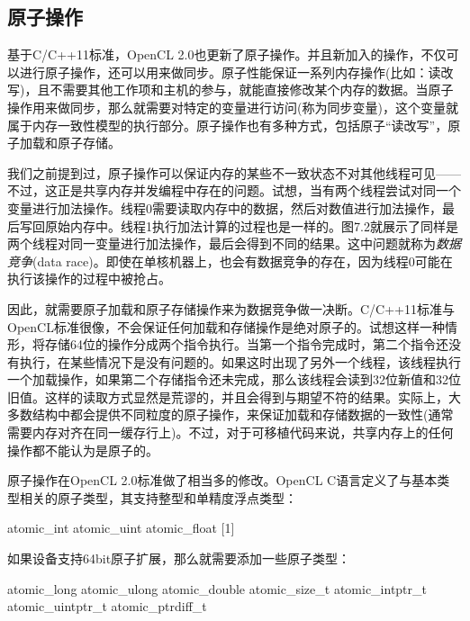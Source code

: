 \subsection{原子操作}

基于C/C++11标准，OpenCL 2.0也更新了原子操作。并且新加入的操作，不仅可以进行原子操作，还可以用来做同步。原子性能保证一系列内存操作(比如：读改写)，且不需要其他工作项和主机的参与，就能直接修改某个内存的数据。当原子操作用来做同步，那么就需要对特定的变量进行访问(称为同步变量)，这个变量就属于内存一致性模型的执行部分。原子操作也有多种方式，包括原子“读改写”，原子加载和原子存储。

我们之前提到过，原子操作可以保证内存的某些不一致状态不对其他线程可见——不过，这正是共享内存并发编程中存在的问题。试想，当有两个线程尝试对同一个变量进行加法操作。线程0需要读取内存中的数据，然后对数值进行加法操作，最后写回原始内存中。线程1执行加法计算的过程也是一样的。图7.2就展示了同样是两个线程对同一变量进行加法操作，最后会得到不同的结果。这中问题就称为\emph{数据竞争}(data race)。即使在单核机器上，也会有数据竞争的存在，因为线程0可能在执行该操作的过程中被抢占。


因此，就需要原子加载和原子存储操作来为数据竞争做一决断。C/C++11标准与OpenCL标准很像，不会保证任何加载和存储操作是绝对原子的。试想这样一种情形，将存储64位的操作分成两个指令执行。当第一个指令完成时，第二个指令还没有执行，在某些情况下是没有问题的。如果这时出现了另外一个线程，该线程执行一个加载操作，如果第二个存储指令还未完成，那么该线程会读到32位新值和32位旧值。这样的读取方式显然是荒谬的，并且会得到与期望不符的结果。实际上，大多数结构中都会提供不同粒度的原子操作，来保证加载和存储数据的一致性(通常需要内存对齐在同一缓存行上)。不过，对于可移植代码来说，共享内存上的任何操作都不能认为是原子的。

原子操作在OpenCL 2.0标准做了相当多的修改。OpenCL C语言定义了与基本类型相关的原子类型，其支持整型和单精度浮点类型：

\begin{codebox}[text]
atomic_int
atomic_uint
atomic_float [1]
\end{codebox}

如果设备支持64bit原子扩展，那么就需要添加一些原子类型：

\begin{codebox}[text]
atomic_long
atomic_ulong
atomic_double
atomic_size_t
atomic_intptr_t
atomic_uintptr_t
atomic_ptrdiff_t
\end{codebox}

